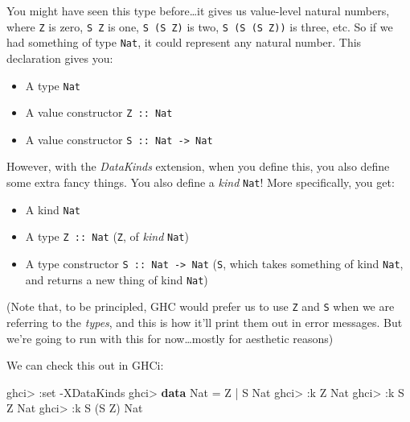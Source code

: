 \documentclass[]{article}
\newenvironment{Shaded}{}{}
\newcommand{\KeywordTok}[1]{\textcolor[rgb]{0.00,0.44,0.13}{\textbf{{#1}}}}
\newcommand{\DataTypeTok}[1]{\textcolor[rgb]{0.56,0.13,0.00}{{#1}}}
\newcommand{\FunctionTok}[1]{\textcolor[rgb]{0.02,0.16,0.49}{{#1}}}
\newcommand{\NormalTok}[1]{{#1}}
\begin{document}
You might have seen this type before\ldots{}it gives us value-level natural
numbers, where \texttt{Z} is zero, \texttt{S\ Z} is one, \texttt{S\ (S\ Z)} is
two, \texttt{S\ (S\ (S\ Z))} is three, etc. So if we had something of type
\texttt{Nat}, it could represent any natural number. This declaration gives you:

\begin{itemize}
\tightlist
\item
  A type \texttt{Nat}
\item
  A value constructor \texttt{Z\ ::\ Nat}
\item
  A value constructor \texttt{S\ ::\ Nat\ -\textgreater{}\ Nat}
\end{itemize}

However, with the \emph{DataKinds} extension, when you define this, you also
define some extra fancy things. You also define a \emph{kind} \texttt{Nat}! More
specifically, you get:

\begin{itemize}
\tightlist
\item
  A kind \texttt{Nat}
\item
  A type \texttt{Z\ ::\ Nat} (\texttt{Z}, of \emph{kind} \texttt{Nat})
\item
  A type constructor \texttt{S\ ::\ Nat\ -\textgreater{}\ Nat} (\texttt{S},
  which takes something of kind \texttt{Nat}, and returns a new thing of kind
  \texttt{Nat})
\end{itemize}

(Note that, to be principled, GHC would prefer us to use
\texttt{\textquotesingle{}Z} and \texttt{\textquotesingle{}S} when we are
referring to the \emph{types}, and this is how it'll print them out in error
messages. But we're going to run with this for now\ldots{}mostly for aesthetic
reasons)

We can check this out in GHCi:

\begin{Shaded}
\begin{Highlighting}[]
\NormalTok{ghci}\FunctionTok{>} \FunctionTok{:}\NormalTok{set }\FunctionTok{-}\DataTypeTok{XDataKinds}
\NormalTok{ghci}\FunctionTok{>} \KeywordTok{data} \DataTypeTok{Nat} \FunctionTok{=} \DataTypeTok{Z} \FunctionTok{|} \DataTypeTok{S} \DataTypeTok{Nat}
\NormalTok{ghci}\FunctionTok{>} \FunctionTok{:}\NormalTok{k }\DataTypeTok{Z}
\DataTypeTok{Nat}
\NormalTok{ghci}\FunctionTok{>} \FunctionTok{:}\NormalTok{k }\DataTypeTok{S} \DataTypeTok{Z}
\DataTypeTok{Nat}
\NormalTok{ghci}\FunctionTok{>} \FunctionTok{:}\NormalTok{k }\DataTypeTok{S} \NormalTok{(}\DataTypeTok{S} \DataTypeTok{Z}\NormalTok{)}
\DataTypeTok{Nat}
\end{Highlighting}
\end{Shaded}
\end{document}
